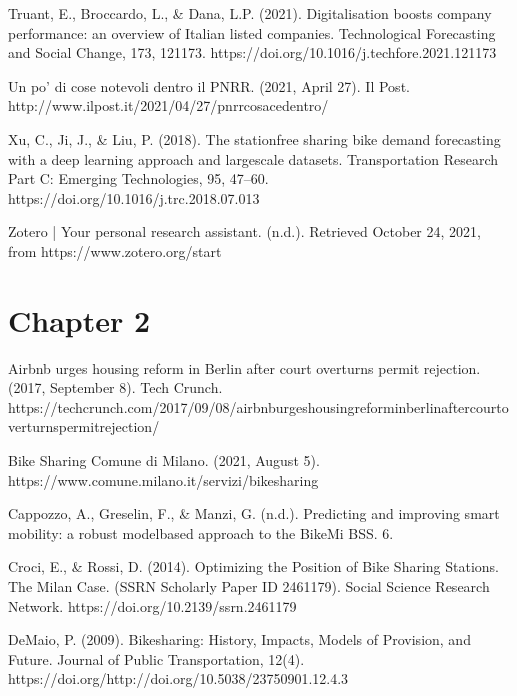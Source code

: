 \documentclass[letterpaper,10pt,english]{jupyterBook}
\begin{document}
\sphinxAtStartPar
Truant, E., Broccardo, L., \& Dana, L.\sphinxhyphen{}P. (2021). Digitalisation boosts company performance: an overview of Italian listed companies. Technological Forecasting and Social Change, 173, 121173. https://doi.org/10.1016/j.techfore.2021.121173

\sphinxAtStartPar
Un po’ di cose notevoli dentro il PNRR. (2021, April 27). Il Post. http://www.ilpost.it/2021/04/27/pnrr\sphinxhyphen{}cosa\sphinxhyphen{}ce\sphinxhyphen{}dentro/

\sphinxAtStartPar
Xu, C., Ji, J., \& Liu, P. (2018). The station\sphinxhyphen{}free sharing bike demand forecasting with a deep learning approach and large\sphinxhyphen{}scale datasets. Transportation Research Part C: Emerging Technologies, 95, 47–60. https://doi.org/10.1016/j.trc.2018.07.013

\sphinxAtStartPar
Zotero | Your personal research assistant. (n.d.). Retrieved October 24, 2021, from https://www.zotero.org/start


\section{Chapter 2}
\label{\detokenize{references:chapter-2}}
\sphinxAtStartPar
Airbnb urges housing reform in Berlin after court overturns permit rejection. (2017, September 8). Tech Crunch. https://techcrunch.com/2017/09/08/airbnb\sphinxhyphen{}urges\sphinxhyphen{}housing\sphinxhyphen{}reform\sphinxhyphen{}in\sphinxhyphen{}berlin\sphinxhyphen{}after\sphinxhyphen{}court\sphinxhyphen{}overturns\sphinxhyphen{}permit\sphinxhyphen{}rejection/

\sphinxAtStartPar
Bike Sharing \sphinxhyphen{} Comune di Milano. (2021, August 5). https://www.comune.milano.it/servizi/bike\sphinxhyphen{}sharing

\sphinxAtStartPar
Cappozzo, A., Greselin, F., \& Manzi, G. (n.d.). Predicting and improving smart mobility: a robust model\sphinxhyphen{}based approach to the BikeMi BSS. 6.

\sphinxAtStartPar
Croci, E., \& Rossi, D. (2014). Optimizing the Position of Bike Sharing Stations. The Milan Case. (SSRN Scholarly Paper ID 2461179). Social Science Research Network. https://doi.org/10.2139/ssrn.2461179

\sphinxAtStartPar
DeMaio, P. (2009). Bike\sphinxhyphen{}sharing: History, Impacts, Models of Provision, and Future. Journal of Public Transportation, 12(4). https://doi.org/http://doi.org/10.5038/2375\sphinxhyphen{}0901.12.4.3
\end{document}

